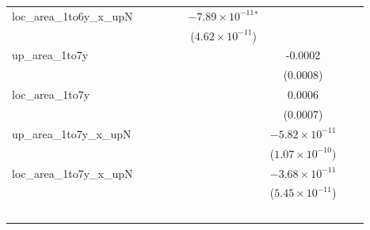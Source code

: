 \begin{tabular}{lcccccccc}
   loc\_area\_1to6y\_x\_upN     &                          &                          &                          &                          & $-7.89\times 10^{-11}$$^{*}$  &                          &                          &   \\   
                                &                          &                          &                          &                          & ($4.62\times 10^{-11}$)       &                          &                          &   \\   
   up\_area\_1to7y              &                          &                          &                          &                          &                               & -0.0002                  &                          &   \\   
                                &                          &                          &                          &                          &                               & (0.0008)                 &                          &   \\   
   loc\_area\_1to7y             &                          &                          &                          &                          &                               & 0.0006                   &                          &   \\   
                                &                          &                          &                          &                          &                               & (0.0007)                 &                          &   \\   
   up\_area\_1to7y\_x\_upN      &                          &                          &                          &                          &                               & $-5.82\times 10^{-11}$   &                          &   \\   
                                &                          &                          &                          &                          &                               & ($1.07\times 10^{-10}$)  &                          &   \\   
   loc\_area\_1to7y\_x\_upN     &                          &                          &                          &                          &                               & $-3.68\times 10^{-11}$   &                          &   \\   
                                &                          &                          &                          &                          &                               & ($5.45\times 10^{-11}$)  &                          &   \\   
$$
\end{tabular}
